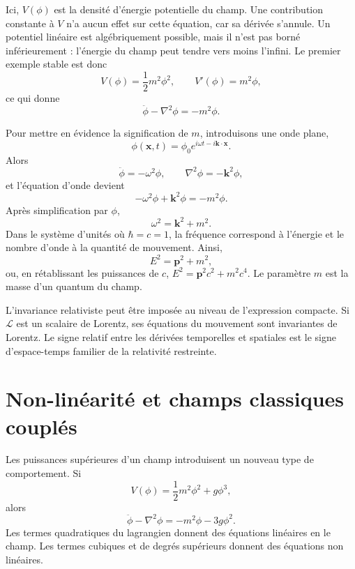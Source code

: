 Ici, \(V(\phi)\) est la densité d’énergie potentielle du champ. Une contribution constante à \(V\) n’a aucun effet sur cette équation, car sa dérivée s’annule. Un potentiel linéaire est algébriquement possible, mais il n’est pas borné inférieurement : l’énergie du champ peut tendre vers moins l’infini. Le premier exemple stable est donc
\begin{equation}
V(\phi)=\frac12m^2\phi^2,
\qquad
V'(\phi)=m^2\phi,
\end{equation}
ce qui donne
\begin{equation}
\ddot\phi-\nabla^2\phi=-m^2\phi.
\end{equation}

Pour mettre en évidence la signification de \(m\), introduisons une onde plane,
\begin{equation}
\phi(\mathbf x,t)=\phi_0e^{i\omega t-i\mathbf k\cdot\mathbf x}.
\end{equation}
Alors
\begin{equation}
\ddot\phi=-\omega^2\phi,
\qquad
\nabla^2\phi=-\mathbf k^2\phi,
\end{equation}
et l’équation d’onde devient
\begin{equation}
-\omega^2\phi+\mathbf k^2\phi=-m^2\phi.
\end{equation}
Après simplification par \(\phi\),
\begin{equation}
\omega^2=\mathbf k^2+m^2.
\end{equation}
Dans le système d’unités où \(\hbar=c=1\), la fréquence correspond à l’énergie et le nombre d’onde à la quantité de mouvement. Ainsi,
\begin{equation}
E^2=\mathbf p^2+m^2,
\end{equation}
ou, en rétablissant les puissances de \(c\), \(E^2=\mathbf p^2c^2+m^2c^4\). Le paramètre \(m\) est la masse d’un quantum du champ.

L’invariance relativiste peut être imposée au niveau de l’expression compacte. Si \(\mathcal L\) est un scalaire de Lorentz, ses équations du mouvement sont invariantes de Lorentz. Le signe relatif entre les dérivées temporelles et spatiales est le signe d’espace-temps familier de la relativité restreinte.

\section{Non-linéarité et champs classiques couplés}

Les puissances supérieures d’un champ introduisent un nouveau type de comportement. Si
\begin{equation}
V(\phi)=\frac12m^2\phi^2+g\phi^3,
\end{equation}
alors
\begin{equation}
\ddot\phi-\nabla^2\phi=-m^2\phi-3g\phi^2.
\end{equation}
Les termes quadratiques du lagrangien donnent des équations linéaires en le champ. Les termes cubiques et de degrés supérieurs donnent des équations non linéaires.

